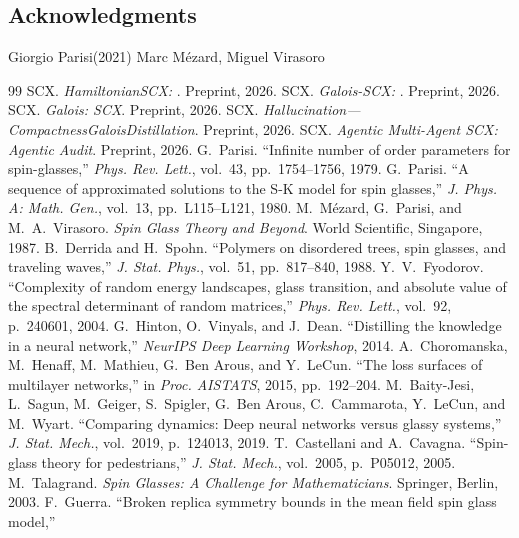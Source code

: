 \documentclass[12pt,a4paper]{article}
\theoremstyle{remark}
\begin{document}
{\subsection*{Acknowledgments}
 Giorgio Parisi(2021) Marc Mézard, Miguel Virasoro 
\begin{thebibliography}{99}
SCX.
\emph{HamiltonianSCX: }.
Preprint, 2026.
SCX.
\emph{Galois-SCX: }.
Preprint, 2026.
SCX.
\emph{Galois: SCX}.
Preprint, 2026.
SCX.
\emph{Hallucination---CompactnessGaloisDistillation}.
Preprint, 2026.
SCX.
\emph{Agentic Multi-Agent SCX: Agentic Audit}.
Preprint, 2026.
G.~Parisi.
``Infinite number of order parameters for spin-glasses,''
\emph{Phys. Rev. Lett.}, vol.~43, pp.~1754--1756, 1979.
G.~Parisi.
``A sequence of approximated solutions to the S-K model for spin glasses,''
\emph{J. Phys. A: Math. Gen.}, vol.~13, pp.~L115--L121, 1980.
M.~M\'ezard, G.~Parisi, and M.~A.~Virasoro.
\emph{Spin Glass Theory and Beyond}.
World Scientific, Singapore, 1987.
B.~Derrida and H.~Spohn.
``Polymers on disordered trees, spin glasses, and traveling waves,''
\emph{J. Stat. Phys.}, vol.~51, pp.~817--840, 1988.
Y.~V.~Fyodorov.
``Complexity of random energy landscapes, glass transition, and absolute value of the spectral determinant of random matrices,''
\emph{Phys. Rev. Lett.}, vol.~92, p.~240601, 2004.
G.~Hinton, O.~Vinyals, and J.~Dean.
``Distilling the knowledge in a neural network,''
\emph{NeurIPS Deep Learning Workshop}, 2014.
A.~Choromanska, M.~Henaff, M.~Mathieu, G.~Ben Arous, and Y.~LeCun.
``The loss surfaces of multilayer networks,''
in \emph{Proc. AISTATS}, 2015, pp.~192--204.
M.~Baity-Jesi, L.~Sagun, M.~Geiger, S.~Spigler, G.~Ben Arous, C.~Cammarota, Y.~LeCun, and M.~Wyart.
``Comparing dynamics: Deep neural networks versus glassy systems,''
\emph{J. Stat. Mech.}, vol.~2019, p.~124013, 2019.
T.~Castellani and A.~Cavagna.
``Spin-glass theory for pedestrians,''
\emph{J. Stat. Mech.}, vol.~2005, p.~P05012, 2005.
M.~Talagrand.
\emph{Spin Glasses: A Challenge for Mathematicians}.
Springer, Berlin, 2003.
F.~Guerra.
``Broken replica symmetry bounds in the mean field spin glass model,''

\end{thebibliography}}
\end{document}
